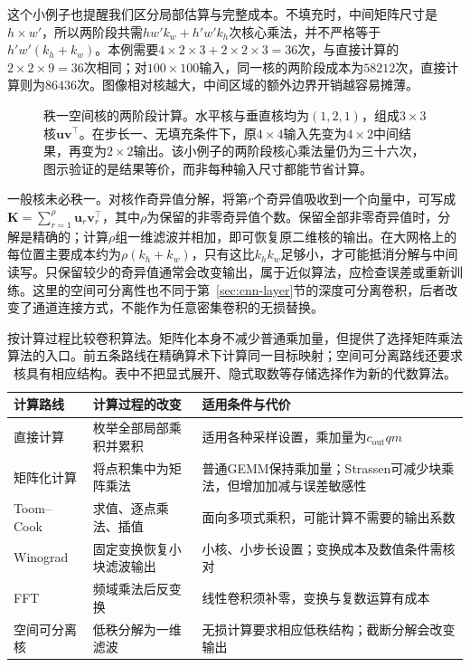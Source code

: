 这个小例子也提醒我们区分局部估算与完整成本。不填充时，中间矩阵尺寸是$h\times w'$，所以两阶段共需$hw'k_w+h'w'k_h$次核心乘法，并不严格等于$h'w'(k_h+k_w)$。本例需要$4\times2\times3+2\times2\times3=36$次，与直接计算的$2\times2\times9=36$次相同；对$100\times100$输入，同一核的两阶段成本为$58212$次，直接计算则为$86436$次。图像相对核越大，中间区域的额外边界开销越容易摊薄。
\begin{figure}[htb]
  \centering
  
  \caption{秩一空间核的两阶段计算。水平核与垂直核均为$(1,2,1)$，组成$3\times3$核$\bm u\bm v^\top$。在步长一、无填充条件下，原$4\times4$输入先变为$4\times2$中间结果，再变为$2\times2$输出。该小例子的两阶段核心乘法量仍为三十六次，图示验证的是结果等价，而非每种输入尺寸都能节省计算。}
  \label{fig:cnn-spatial-separable}
\end{figure}


一般核未必秩一。对核作奇异值分解，将第$r$个奇异值吸收到一个向量中，可写成$\bm K=\sum_{r=1}^{\rho}\bm u_r\bm v_r^\top$，其中$\rho$为保留的非零奇异值个数。保留全部非零奇异值时，分解是精确的；计算$\rho$组一维滤波并相加，即可恢复原二维核的输出。在大网格上的每位置主要成本约为$\rho(k_h+k_w)$，只有这比$k_hk_w$足够小，才可能抵消分解与中间读写。只保留较少的奇异值通常会改变输出，属于近似算法，应检查误差或重新训练。这里的空间可分离性也不同于第~\ref{sec:cnn-layer}节的深度可分离卷积，后者改变了通道连接方式，不能作为任意密集卷积的无损替换。

\begin{table}[htb]
  \centering
  \begin{tabularx}{\linewidth}{@{}lXX@{}}
    \toprule
    计算路线 & 计算过程的改变 & 适用条件与代价\\
    \midrule
    直接计算 & 枚举全部局部乘积并累积 & 适用各种采样设置，乘加量为$c_{\mathrm{out}}qm$\\
    矩阵化计算 & 将点积集中为矩阵乘法 & 普通GEMM保持乘加量；Strassen可减少块乘法，但增加加减与误差敏感性\\
    Toom--Cook & 求值、逐点乘法、插值 & 面向多项式乘积，可能计算不需要的输出系数\\
    Winograd & 固定变换恢复小块滤波输出 & 小核、小步长设置；变换成本及数值条件需核对\\
    FFT & 频域乘法后反变换 & 线性卷积须补零，变换与复数运算有成本\\
    空间可分离核 & 低秩分解为一维滤波 & 无损计算要求相应低秩结构；截断分解会改变输出\\
    \bottomrule
  \end{tabularx}
  \caption{按计算过程比较卷积算法。矩阵化本身不减少普通乘加量，但提供了选择矩阵乘法算法的入口。前五条路线在精确算术下计算同一目标映射；空间可分离路线还要求核具有相应结构。表中不把显式展开、隐式取数等存储选择作为新的代数算法。}
  \label{tab:cnn-algorithms}
\end{table}

